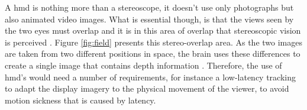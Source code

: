 A \acrshort{hmd} is nothing more than a stereoscope, it doesn't use only photographs but also animated
video images. What is essential though, is that the views seen by the two eyes
must overlap and it is in this area of overlap that stereoscopic vision is perceived \citep{Vince2011}.
Figure \ref{fig:field} presents this stereo-overlap area. As the two images are taken from two different positions in space, the brain uses these
differences to create a single image that contains depth information \citep{Vince2011}. Therefore, the use of \acrshort{hmd}'s would need a number of requirements, for instance a low-latency tracking to adapt the display imagery to the physical movement of the viewer, to avoid motion sickness that is caused by latency.  






  
